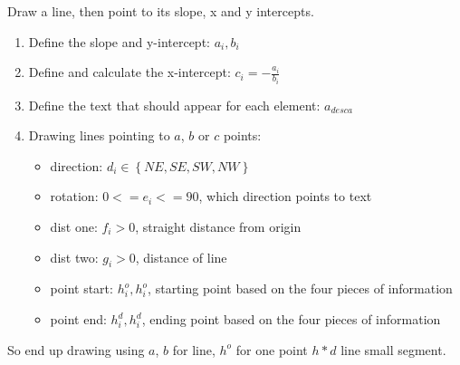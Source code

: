 \documentclass{article}
\begin{document}
Draw a line, then point to its slope, x and y intercepts.

\begin{enumerate}
  \item Define the slope and y-intercept: $a_i, b_i$
  \item Define and calculate the x-intercept: $c_i = -\frac{a_i}{b_i}$
  \item Define the text that should appear for each element: $a_{desca}$
  \item Drawing lines pointing to $a$, $b$ or $c$ points:
  \begin{itemize}
    \item direction: $d_i \in \left\{NE, SE, SW, NW\right\}$
    \item rotation: $0 <= e_i <= 90$, which direction points to text
    \item dist one: $f_i > 0 $, straight distance from origin
    \item dist two: $g_i > 0 $, distance of line
    \item point start: $h^o_i, h^o_i$, starting point based on the four pieces of information
    \item point end: $h^d_i, h^d_i$, ending point based on the four pieces of information
  \end{itemize}
\end{enumerate}

So end up drawing using $a$, $b$ for line, $h^o$ for one point $h*d$ line small segment.

\begin{verbatim}
\end{verbatim}
\bigskip
\begin{center}
\end{center}
\end{document}

